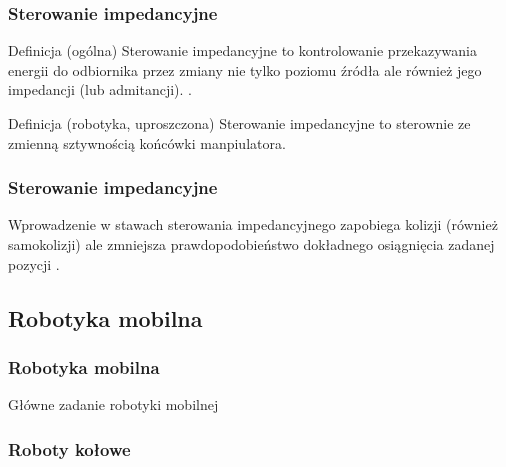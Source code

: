 
\begin{frame}
\frametitle{Sterowanie impedancyjne}
\begin{block}{Definicja (ogólna)}
Sterowanie impedancyjne to kontrolowanie przekazywania energii do odbiornika przez zmiany nie tylko poziomu źródła ale również jego impedancji (lub admitancji). \cite{pl}.
\end{block}

\begin{block}{Definicja (robotyka, uproszczona)}
Sterowanie impedancyjne to sterownie ze zmienną sztywnością końcówki manpiulatora. 
\end{block}
\end{frame}


\begin{frame}
\frametitle{Sterowanie impedancyjne}

\begin{block}{}
Wprowadzenie w stawach sterowania impedancyjnego zapobiega kolizji (również samokolizji) ale zmniejsza 
prawdopodobieństwo dokładnego osiągnięcia zadanej pozycji \cite{borkowska}.
\end{block}

\end{frame}



\subsection{Robotyka mobilna}


\begin{frame}
\frametitle{Robotyka mobilna}
\begin{block}{Główne zadanie robotyki mobilnej}\end{block}
\end{frame}


\begin{frame}
\frametitle{Roboty kołowe}

\end{frame}


